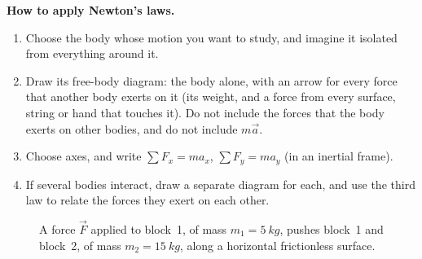 \documentclass[11pt,a4paper]{article}
\begin{document}
\begin{keyresult}
\textbf{How to apply Newton's laws.}
\begin{enumerate}[leftmargin=*]
  \item Choose the body whose motion you want to study, and imagine it isolated from everything
    around it.
  \item Draw its free-body diagram: the body alone, with an arrow for every force that another body
    exerts on it (its weight, and a force from every surface, string or hand that touches it).
    Do not include the forces that the body exerts on other bodies, and do not include $m\vec{a}$.
  \item Choose axes, and write $\sum F_x = m a_x$, $\sum F_y = m a_y$ (in an inertial frame).
  \item If several bodies interact, draw a separate diagram for each, and use the third law to
    relate the forces they exert on each other.
\end{enumerate}
\end{keyresult}

\begin{figure}[ht]
\centering
{}
\caption{A force $\vec{F}$ applied to block~1, of mass $m_1 = \qty{5}{kg}$, pushes block~1 and
block~2, of mass $m_2 = \qty{15}{kg}$, along a horizontal frictionless surface.}\label{fig:blocks}
\end{figure}
\end{document}
